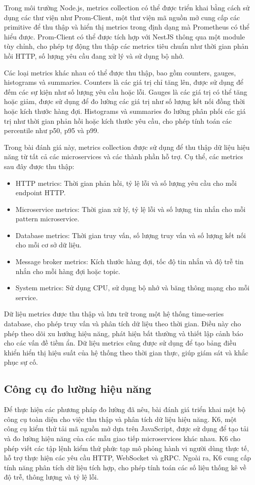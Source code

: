Trong môi trường Node.js, metrics collection có thể được triển khai bằng cách sử dụng các thư viện như Prom-Client, một thư viện mã nguồn mở cung cấp các primitive để thu thập và hiển thị metrics trong định dạng mà Prometheus có thể hiểu được. Prom-Client có thể được tích hợp với NestJS thông qua một module tùy chỉnh, cho phép tự động thu thập các metrics tiêu chuẩn như thời gian phản hồi HTTP, số lượng yêu cầu đang xử lý và sử dụng bộ nhớ.

Các loại metrics khác nhau có thể được thu thập, bao gồm counters, gauges, histograms và summaries. Counters là các giá trị chỉ tăng lên, được sử dụng để đếm các sự kiện như số lượng yêu cầu hoặc lỗi. Gauges là các giá trị có thể tăng hoặc giảm, được sử dụng để đo lường các giá trị như số lượng kết nối đồng thời hoặc kích thước hàng đợi. Histograms và summaries đo lường phân phối các giá trị như thời gian phản hồi hoặc kích thước yêu cầu, cho phép tính toán các percentile như p50, p95 và p99.

Trong bài đánh giá này, metrics collection được sử dụng để thu thập dữ liệu hiệu năng từ tất cả các microservices và các thành phần hỗ trợ. Cụ thể, các metrics sau đây được thu thập:

\begin{itemize}
    \item HTTP metrics: Thời gian phản hồi, tỷ lệ lỗi và số lượng yêu cầu cho mỗi endpoint HTTP.
    \item Microservice metrics: Thời gian xử lý, tỷ lệ lỗi và số lượng tin nhắn cho mỗi pattern microservice.
    \item Database metrics: Thời gian truy vấn, số lượng truy vấn và số lượng kết nối cho mỗi cơ sở dữ liệu.
    \item Message broker metrics: Kích thước hàng đợi, tốc độ tin nhắn và độ trễ tin nhắn cho mỗi hàng đợi hoặc topic.
    \item System metrics: Sử dụng CPU, sử dụng bộ nhớ và băng thông mạng cho mỗi service.
\end{itemize}

Dữ liệu metrics được thu thập và lưu trữ trong một hệ thống time-series database, cho phép truy vấn và phân tích dữ liệu theo thời gian. Điều này cho phép theo dõi xu hướng hiệu năng, phát hiện bất thường và thiết lập cảnh báo cho các vấn đề tiềm ẩn. Dữ liệu metrics cũng được sử dụng để tạo bảng điều khiển hiển thị hiệu suất của hệ thống theo thời gian thực, giúp giám sát và khắc phục sự cố.

\subsection{Công cụ đo lường hiệu năng}
Để thực hiện các phương pháp đo lường đã nêu, bài đánh giá triển khai một bộ công cụ toàn diện cho việc thu thập và phân tích dữ liệu hiệu năng. K6, một công cụ kiểm thử tải mã nguồn mở dựa trên JavaScript, được sử dụng để tạo tải và đo lường hiệu năng của các mẫu giao tiếp microservices khác nhau. K6 cho phép viết các tập lệnh kiểm thử phức tạp mô phỏng hành vi người dùng thực tế, hỗ trợ thực hiện các yêu cầu HTTP, WebSocket và gRPC. Ngoài ra, K6 cung cấp tính năng phân tích dữ liệu tích hợp, cho phép tính toán các số liệu thống kê về độ trễ, thông lượng và tỷ lệ lỗi.

